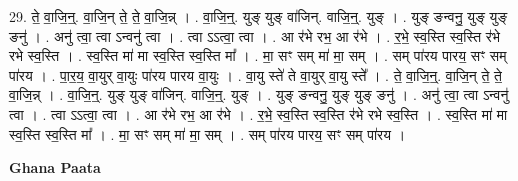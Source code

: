 \documentclass[17pt]{extarticle}
\begin{document}
29. ते॒ वा॒जि॒न्॒. वा॒जि॒न् ते॒ ते॒ वा॒जि॒न्न् । . वा॒जि॒न्॒. युङ् युङ् वा॑जिन्. वाजि॒न्॒. युङ् । . युङ् ङन्वनु॒ युङ् युङ् ङनु॑ । . अनु॑ त्वा॒ त्वा ऽन्वनु॑ त्वा । . त्वा ऽऽत्वा॒ त्वा । . आ र॑भे रभ॒ आ र॑भे । . र॒भे॒ स्व॒स्ति स्व॒स्ति र॑भे रभे स्व॒स्ति । . स्व॒स्ति मा॑ मा स्व॒स्ति स्व॒स्ति मा᳚ । . मा॒ सꣳ सम् मा॑ मा॒ सम् । . सम् पा॑रय पारय॒ सꣳ सम् पा॑रय । . पा॒र॒य॒ वा॒युर् वा॒युः पा॑रय पारय वा॒युः । . वा॒यु स्ते॑ ते वा॒युर् वा॒यु स्ते᳚ । . ते॒ वा॒जि॒न्॒. वा॒जि॒न् ते॒ ते॒ वा॒जि॒न्न् । . वा॒जि॒न्॒. युङ् युङ् वा॑जिन्. वाजि॒न्॒. युङ् । . युङ् ङन्वनु॒ युङ् युङ् ङनु॑ । . अनु॑ त्वा॒ त्वा ऽन्वनु॑ त्वा । . त्वा ऽऽत्वा॒ त्वा । . आ र॑भे रभ॒ आ र॑भे । . र॒भे॒ स्व॒स्ति स्व॒स्ति र॑भे रभे स्व॒स्ति । . स्व॒स्ति मा॑ मा स्व॒स्ति स्व॒स्ति मा᳚ । . मा॒ सꣳ सम् मा॑ मा॒ सम् । . सम् पा॑रय पारय॒ सꣳ सम् पा॑रय । \newline

\textbf{Ghana Paata } \newline
\end{document}

